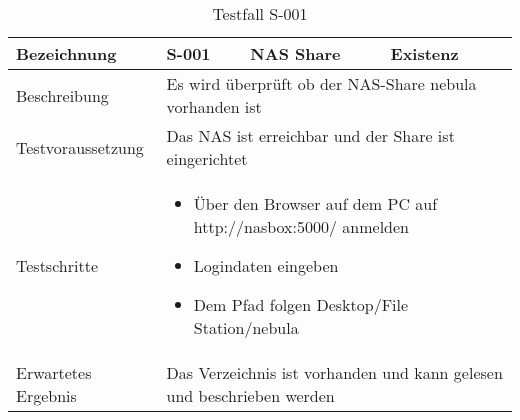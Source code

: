 \begin{table}[H]
\centering
\begin{tabular}{|p{4cm}|p{4cm}|p{4cm}|p{4cm}|}
\hline
Bezeichnung & \textbf{S-001} & NAS Share & Existenz \\\hline
Beschreibung & \multicolumn{3}{p{12cm}|}{Es wird überprüft ob der NAS-Share nebula vorhanden ist} \\\hline
Testvoraussetzung & \multicolumn{3}{p{12cm}|}{Das NAS ist erreichbar und der Share ist eingerichtet} \\\hline
Testschritte & \multicolumn{3}{p{12cm}|}{\begin{itemize}
\item Über den Browser auf dem PC auf http://nasbox:5000/ anmelden
\item Logindaten eingeben
\item Dem Pfad folgen Desktop/File Station/nebula
\end{itemize}} \\ \hline
Erwartetes Ergebnis & \multicolumn{3}{p{12cm}|}{Das Verzeichnis ist vorhanden und kann gelesen und beschrieben werden}\\\hline
\end{tabular}
\caption{Testfall S-001}
\label{Testfall S-001}
\end{table}